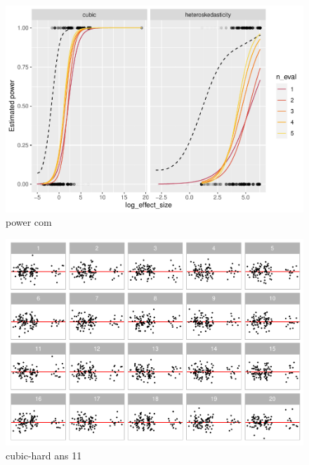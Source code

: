 \documentclass[]{interact}
\theoremstyle{plain}%
\theoremstyle{definition}
\theoremstyle{remark}
\begin{document}
\begin{figure}
\centering
\includegraphics{paper_comparison_files/figure-latex/power-com-1.pdf}
\caption{\label{fig:power-com}power com}
\end{figure}

\begin{figure}
\centering
\includegraphics{paper_comparison_files/figure-latex/cubic-hard-1.pdf}
\caption{\label{fig:cubic-hard}cubic-hard ans 11}
\end{figure}
\end{document}
